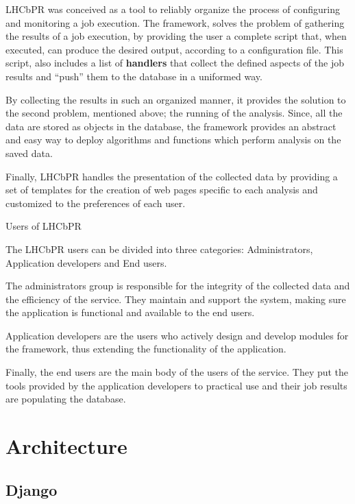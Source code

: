 \documentclass{lhcbnote}
\begin{document}
LHCbPR was conceived as a tool to reliably organize the process of configuring and monitoring a job execution. 
The framework, solves the problem of gathering the results of a job execution, by providing the user a complete script that, when executed, 
can produce the desired output, according to a configuration file. This script, also includes a list of {\bf handlers} 
that collect the defined aspects of the job results and “push” them to the database in a uniformed way. 
	
By collecting the results in such an organized manner, it provides the solution to the second problem, mentioned above; 
the running of the analysis. Since, all the data are stored as objects in the database, 
the framework provides an abstract and easy way to deploy algorithms and functions which perform analysis on the saved data. 
	
Finally, LHCbPR handles the presentation of the collected data by providing a set of templates 
for the creation of web pages specific to each analysis and customized to the preferences of each user. 
 
\vspace{6 mm}

\noindent Users of LHCbPR


\vspace{4 mm}

The LHCbPR users can be divided into three categories: Administrators, Application developers and End users. 

The administrators group is responsible for the integrity of the collected data and the efficiency of the service. They maintain and support the system, 
making sure the application is functional and available to the end users.

Application developers are the users who actively design and develop modules for the framework, thus extending the functionality of the application.

Finally, the end users are the main body of the users of the service. They put the tools provided by the application developers to practical use and 
their job results are populating the database.

\section{Architecture}

\subsection{Django}
\end{document}
